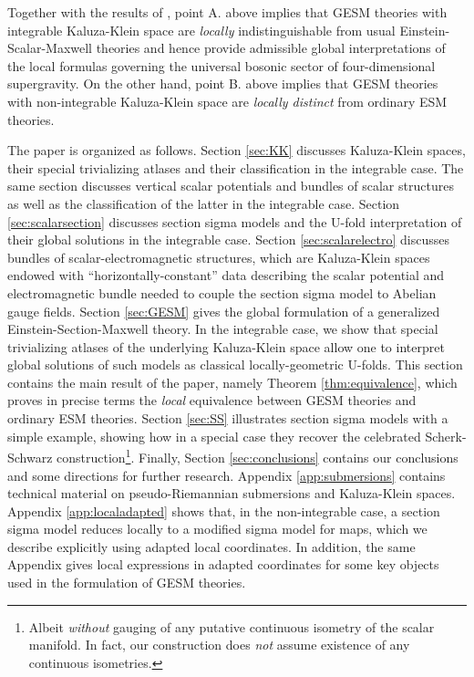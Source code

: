 \documentclass[10pt, cmp, numbook, final, a4paper]{svjour}
\begin{document}
Together with the results of \cite{GESM}, point A. above implies that
GESM theories with integrable Kaluza-Klein space are {\em locally}
indistinguishable from usual Einstein-Scalar-Maxwell theories and
hence provide admissible global interpretations of the local formulas
governing the universal bosonic sector of four-dimensional
supergravity. On the other hand, point B. above implies that GESM
theories with non-integrable Kaluza-Klein space are {\em locally
  distinct} from ordinary ESM theories.

The paper is organized as follows. Section \ref{sec:KK} discusses
Kaluza-Klein spaces, their special trivializing atlases and their
classification in the integrable case. The same section discusses
vertical scalar potentials and bundles of scalar structures as well as
the classification of the latter in the integrable case.  Section
\ref{sec:scalarsection} discusses section sigma models and the U-fold
interpretation of their global solutions in the integrable
case. Section \ref{sec:scalarelectro} discusses bundles of
scalar-electromagnetic structures, which are Kaluza-Klein spaces
endowed with ``horizontally-constant'' data describing the scalar
potential and electromagnetic bundle needed to couple the section
sigma model to Abelian gauge fields. Section \ref{sec:GESM} gives the
global formulation of a generalized Einstein-Section-Maxwell
theory. In the integrable case, we show that special trivializing
atlases of the underlying Kaluza-Klein space allow one to interpret
global solutions of such models as classical locally-geometric
U-folds. This section contains the main result of the paper, namely
Theorem \ref{thm:equivalence}, which proves in precise terms the {\em
  local} equivalence between GESM theories and ordinary ESM
theories. Section \ref{sec:SS} illustrates section sigma models with a
simple example, showing how in a special case they recover the
celebrated Scherk-Schwarz construction\footnote{Albeit {\em without}
  gauging of any putative continuous isometry of the scalar
  manifold. In fact, our construction does {\em not} assume existence
  of any continuous isometries.}. Finally, Section
\ref{sec:conclusions} contains our conclusions and some directions for
further research. Appendix \ref{app:submersions} contains technical
material on pseudo-Riemannian submersions and Kaluza-Klein
spaces. Appendix \ref{app:localadapted} shows that, in the
non-integrable case, a section sigma model reduces locally to a
modified sigma model for maps, which we describe explicitly using
adapted local coordinates. In addition, the same Appendix gives local
expressions in adapted coordinates for some key objects used in the
formulation of GESM theories.
\end{document}
